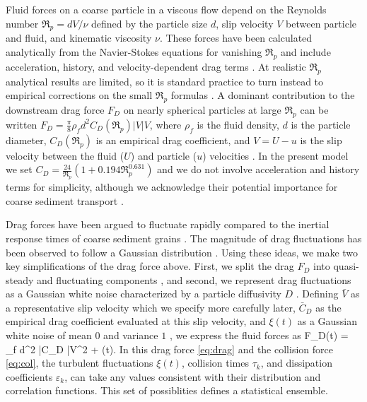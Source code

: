 Fluid forces on a coarse particle in a viscous flow depend on the Reynolds number $\Re_p = d V/\nu$ defined by the particle size $d$, slip velocity $V$ between particle and fluid, and kinematic viscosity $\nu$.
These forces have been calculated analytically from the Navier-Stokes equations for vanishing $\Re_p$ and include acceleration, history, and velocity-dependent drag terms \citep{Hjelmfelt1966, Maxey1983, Auton1987}.
At realistic $\Re_p$ analytical results are limited, so it is standard practice to turn instead to empirical corrections on the small $\Re_p$ formulas \citep{Schmeeckle2007,Clift1978}.
A dominant contribution to the downstream drag force $F_D$ on nearly spherical particles at large $\Re_p$ can be written $F_D = \frac{\pi}{8}
\rho_f d^2 C_D(\Re_p) |V|V$, where $\rho_f$ is the fluid density, $d$ is the particle diameter, $C_D(\Re_p)$ is an empirical drag coefficient, and $V = U-u$ is the slip velocity between the fluid ($U$) and particle ($u$) velocities \citep{Coleman1967, Schmeeckle2007, Dwivedi2012}.
In the present model we set $C_D = \frac{24}{\Re_p}( 1 + 0.194 \Re_p^{0.631})$ \citep{Clift1978,Gonzalez2017} and we do not involve acceleration and history terms for simplicity, although we acknowledge their potential importance for coarse sediment transport \citep{Michaelides1997,Armenio2001}.

Drag forces have been argued to fluctuate rapidly compared to the inertial response times of coarse sediment grains \citep{Fan2014}.
The magnitude of drag fluctuations has been observed to follow a Gaussian distribution \citep{Hofland2006,Schmeeckle2007,Dwivedi2010,Celik2014}.
Using these ideas, we make two key simplifications of the drag force above.
First, we split the drag $F_D$ into quasi-steady and fluctuating components \citep{Michaelides1997}, and second, we represent drag fluctuations as a Gaussian white noise characterized by a particle diffusivity $D$ \citep{Fan2014,Ancey2014}. 
Defining $\bar{V}$ as a representative slip velocity which we specify more carefully later,  $\bar{C}_D$ as the empirical drag coefficient evaluated at this slip velocity, and $\xi(t)$ as a Gaussian white noise of mean $0$ and variance $1$ \citep{Gardiner1983}, we express the fluid forces as
\be F_D(t) = 
\rho_f d^2 \bar{C}_D \bar{V}^2 +  \eta(t). \ee
In this drag force \ref{eq:drag} and the collision force \ref{eq:col}, the turbulent fluctuations $\xi(t)$, collision times $\tau_k$, and dissipation coefficients $\varepsilon_k$, can take any values consistent with their distribution and correlation functions. This set of possiblities defines a statistical ensemble.

